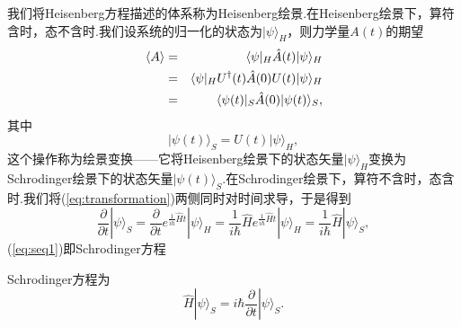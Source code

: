 			我们将Heisenberg方程描述的体系称为Heisenberg绘景.在Heisenberg绘景下，算符含时，态不含时.我们设系统的归一化的状态为$\vert\psi\rangle_H$，则力学量$A(t)$的期望
			\begin{eqnarray}
				\langle A\rangle&=&\langle\psi\vert_H\hat{A}(t)\vert\psi\rangle_H\notag\\
				&=&\langle\psi\vert_H U^\dagger(t)\hat{A}(0)U(t)\vert\psi\rangle_H\notag\\
				&=&\langle\psi(t)\vert_S\hat{A}(0)\vert\psi(t)\rangle_S,
			\end{eqnarray}
			其中
			\begin{equation}\label{eq:transformation}
				\vert\psi(t)\rangle_S=U(t)\vert\psi\rangle_H,
			\end{equation}
			这个操作称为绘景变换——它将Heisenberg绘景下的状态矢量$\vert\psi\rangle_H$变换为Schrodinger绘景下的状态矢量$\vert\psi(t)\rangle_S$.在Schrodinger绘景下，算符不含时，态含时.我们将(\ref{eq:transformation})两侧同时对时间求导，于是得到
			\begin{equation}\label{eq:seq1}
				\frac{\partial}{\partial t}|\psi\rangle_{S}=\frac{\partial}{\partial t} e^{\frac{1}{i \hbar} \hat{H} t}|\psi\rangle_{H}=\frac{1}{i \hbar} \hat{H} e^{\frac{1}{i \hbar} \hat{H} t}|\psi\rangle_{H}=\frac{1}{i\hbar} \hat{H}|\psi\rangle_{S},
			\end{equation}
			(\ref{eq:seq1})即Schrodinger方程
			\begin{definition}Schrodinger方程为
				\begin{equation}\label{eq:seq2}
					\hat{H}|\psi\rangle_{S}=i\hbar\frac{\partial}{\partial t}|\psi\rangle_{S}.
				\end{equation}
			\end{definition}



\newpage